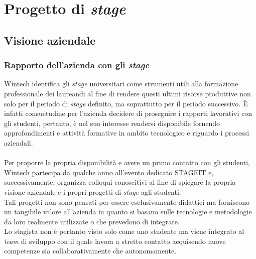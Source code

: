 \chapter{Progetto di \emph{stage}}
\label{cap:progettoDiStage}

\section{Visione aziendale}
\subsection{Rapporto dell'azienda con gli \emph{stage}}
Wintech identifica gli \emph{stage} universitari come strumenti utili alla formazione professionale dei laureandi al fine di rendere questi ultimi risorse produttive non solo per il periodo di \emph{stage} definito, ma soprattutto per il periodo successivo. È infatti consuetudine per l'azienda decidere di proseguire i rapporti lavorativi con gli studenti, pertanto, è nel suo interesse rendersi disponibile fornendo approfondimenti e attività formative in ambito tecnologico e riguardo i processi aziendali.\\\\
Per proporre la propria disponibilità e avere un primo contatto con gli studenti, Wintech partecipa da qualche anno all'evento dedicato \gls{STAGEIT} e, successivamente, organizza colloqui conoscitivi al fine di spiegare la propria visione aziendale e i propri progetti di \emph{stage} agli studenti.\\
Tali progetti non sono pensati per essere esclusivamente didattici ma forniscono un tangibile valore all'azienda in quanto si basano sulle tecnologie e metodologie da loro realmente utilizzate o che prevedono di integrare.\\
Lo stagista non è pertanto visto solo come uno studente ma viene integrato al \emph{team} di sviluppo con il quale lavora a stretto contatto acquisendo nuove competenze sia collaborativamente che autonomamente.\\

